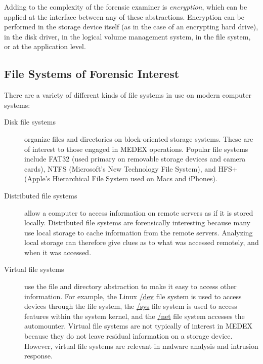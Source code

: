 \documentclass[11pt,letter]{article}
\begin{document}
Adding to the complexity of the forensic examiner is
\emph{encryption}, which can be applied at the interface between any
of these abstractions. Encryption can be performed in the storage
device itself (as in the case of an encrypting hard drive), in the
disk driver, in the logical volume management system, in the file
system, or at the application level.

\subsection{File Systems of Forensic Interest}
There are a variety of different kinds of file systems in use on
modern computer systems:
\begin{description}
\item[Disk file systems] organize files and directories on
  block-oriented storage systems. These are of interest to those
  engaged in MEDEX operations. Popular file systems include FAT32
  (used primary on removable storage devices and camera cards), NTFS
  (Microsoft's New Technology File System), and HFS+ (Apple's
  Hierarchical File System used on Macs and iPhones).
\item[Distributed file systems] allow a computer to access
  information on remote servers as if it is stored
  locally. Distributed file systems are forensically interesting
  because many use local storage to cache information from the remote
  servers. Analyzing local storage can therefore give clues as to what
  was accessed remotely, and when it was accessed.
\item[Virtual file systems] use the file and directory abstraction to
  make it easy to access other information. For example, the Linux
  \url{/dev} file system is used to access devices through the file
  system, the \url{/sys} file system is used to access features within
  the system kernel, and the \url{/net} file system accesses the
  automounter. Virtual file systems are not typically of interest in
  MEDEX because they do not leave residual information on a storage
  device. However, virtual file systems are relevant in malware
  analysis and intrusion response.
\end{description}
\end{document}
